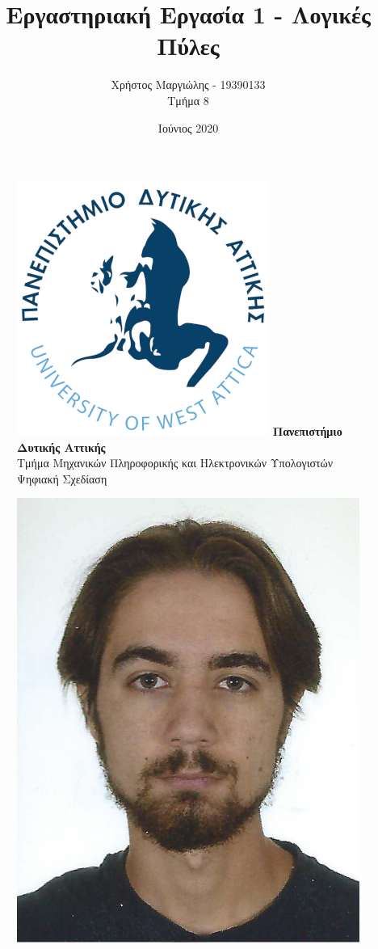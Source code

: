 \documentclass{article}
\title{Εργαστηριακή Εργασία 1 - Λογικές Πύλες}
\author{Χρήστος Μαργιώλης - 19390133 \\ Τμήμα 8}
\date{Ιούνιος 2020}
\begin{document}
\begin{figure}[t!]
    \centering
    \includegraphics[scale=0.3, center]{./res/Logo_University_of_West_Attica.png}
    \Large
    \textbf{Πανεπιστήμιο Δυτικής Αττικής} \\
    \large
    Τμήμα Μηχανικών Πληροφορικής και Ηλεκτρονικών Υπολογιστών \\
    Ψηφιακή Σχεδίαση
\end{figure}
\begin{figure}[b]
    \centering
    \includegraphics[scale=1]{./res/19390133.jpeg}
\end{figure}
\end{document}

